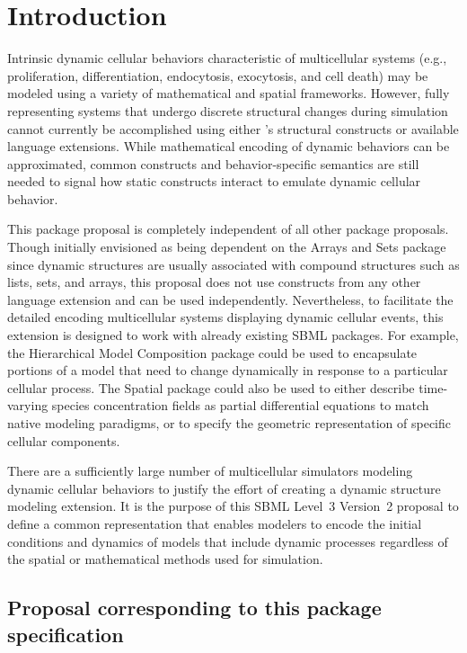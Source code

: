 
\section{Introduction}
\label{sec:intro}

Intrinsic dynamic cellular behaviors characteristic of multicellular systems (e.g., proliferation, differentiation, endocytosis, exocytosis, and cell death) may be modeled using a variety of mathematical and spatial frameworks. However, fully representing systems that undergo discrete structural changes during simulation cannot currently be accomplished using either \sbmlthreecore 's structural constructs or available language extensions. While mathematical encoding of dynamic behaviors can be approximated, common constructs and behavior-specific semantics are still needed to signal how static constructs interact to emulate dynamic cellular behavior.

This package proposal is completely independent of all other package proposals. Though initially envisioned as being dependent on the Arrays and Sets package since dynamic structures are usually associated with compound structures such as lists, sets, and arrays, this proposal does not use constructs from any other language extension and can be used independently. Nevertheless, to facilitate the detailed encoding multicellular systems displaying dynamic cellular events, this extension is designed to work with already existing SBML packages. For example, the Hierarchical Model Composition package could be used to encapsulate portions of a model that need to change dynamically in response to a particular cellular process. The Spatial package could also be used to either describe time-varying species concentration fields as partial differential equations to match native modeling paradigms, or to specify the geometric representation of specific cellular components.

There are a sufficiently large number of multicellular simulators modeling dynamic cellular behaviors to justify the effort of creating a dynamic structure modeling extension. It is the purpose of this SBML Level~3 Version~2 proposal to define a common representation that enables modelers to encode the initial conditions and dynamics of  models that include dynamic processes regardless of the spatial or mathematical methods used for simulation.  

\subsection{Proposal corresponding to this package specification}
\label{subsec:intro}

